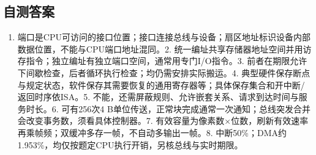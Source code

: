 \subsection{自测答案}\label{CO07-recall-answers}

\begin{enumerate}
\def\labelenumi{\arabic{enumi}.}
\tightlist
\item
  端口是CPU可访问的接口位置；接口连接总线与设备；扇区地址标识设备内部数据位置，不能与CPU端口地址混同。2. 统一编址共享存储器地址空间并用访存指令；独立编址有独立端口空间，通常用专门I/O指令。3. 前者在期限允许下间歇检查，后者循环执行检查；均仍需安排实际搬运。4. 典型硬件保存断点与规定状态，软件保存其需要恢复的通用寄存器等；具体保存集合和开中断/返回时序依ISA。5. 不能，还需屏蔽规则、允许嵌套关系、请求到达时间与服务时长。6. 可有256次4 B单位传送，正常块完成通常一次通知；总线突发合并会改变事务数，须看具体控制器。7. 有效容量为像素数\ensuremath{\times}位数，刷新有效速率再乘帧频；双缓冲多存一帧，不自动多输出一帧。8. 中断50\%；DMA约1.953\%，均仅按题定CPU执行开销，另核总线与实时期限。
\end{enumerate}
